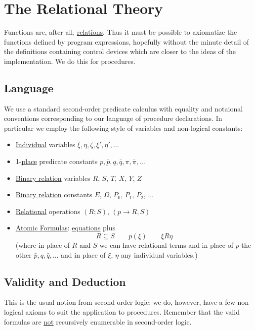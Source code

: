 \documentclass{article}
\begin{document}
\section{The Relational Theory}

Functions are, after all, \underline{relations}. Thus it must be possible to axiomatize the functions defined by program expressions, hopefully without the minute detail of the definitions containing control devices which are closer to the ideas of the implementation. We do this for procedures.

\subsection{Language}

We use a standard second-order predicate calculus with equality and notaional conventions corresponding to our language of procedure declarations. In particular we employ the following style of variables and non-logical constants:

\begin{itemize}
    \item \underline{Individual} variables $\xi, \eta, \zeta, \xi', \eta', \ldots$
    \item 1-\underline{place} predicate constants $p, \bar{p}, q, \bar{q}, \pi, \bar{\pi}, \ldots$
    \item \underline{Binary relation} variables $R$, $S$, $T$, $X$, $Y$, $Z$
    \item \underline{Binary relation} constants $E$, $\Omega$, $P_0$, $P_1$, $P_2$, $\ldots$
    \item \underline{Relational} operations $(R;S)$, $(p \to R, S)$
    \item \underline{Atomic Formulas}: \underline{equations} plus 
        \begin{equation*}
            R \subseteq S \quad\quad p(\xi) \quad\quad \xi R \eta
        \end{equation*}
        (where in place of $R$ and $S$ we can have relational terms and in place of $p$ the other $\bar{p}, q, \bar{q}, \ldots$ and in place of $\xi$, $\eta$ any individual variables.) 
\end{itemize}

\subsection{Validity and Deduction}

This is the usual notion from second-order logic; we do, however, have a few non-logical axioms to suit the application to procedures. Remember that the valid formulas are \underline{not} recursively enumerable in second-order logic. \\
\end{document}
